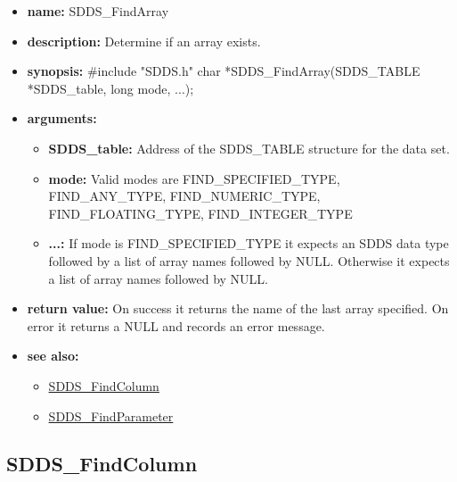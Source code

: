 \documentclass[11pt]{article}
\newcommand{\progref}[1]{\hyperref{SDDS_#1}{{\tt SDDS\_#1} (}{)}{SDDS_#1}}
\begin{document}
\begin{itemize}
\item {\bf name:}\newline
SDDS\_FindArray
\item {\bf description:}\newline
Determine if an array exists.
\item {\bf synopsis:} \#include "SDDS.h"\newline
char *SDDS\_FindArray(SDDS\_TABLE *SDDS\_table, long mode, ...);
\item {\bf arguments:}
\begin{itemize}
\item {\bf SDDS\_table:} Address of the SDDS\_TABLE structure for the data set.
\item {\bf mode:} Valid modes are FIND\_SPECIFIED\_TYPE, FIND\_ANY\_TYPE, FIND\_NUMERIC\_TYPE, FIND\_FLOATING\_TYPE, FIND\_INTEGER\_TYPE
\item {\bf ...:} If mode is FIND\_SPECIFIED\_TYPE it expects an SDDS data type followed by a list of array names followed by NULL. Otherwise it expects a list of array names followed by NULL.
\end{itemize}
\item {\bf return value:}\newline
On success it returns the name of the last array specified. On error it returns a NULL and records an error message.
\item {\bf see also:}
\begin{itemize}
\item \progref{FindColumn}
\item \progref{FindParameter}
\end{itemize}
\end{itemize}

\subsection{SDDS\_FindColumn}
\label{SDDS_FindColumn}
\end{document}
